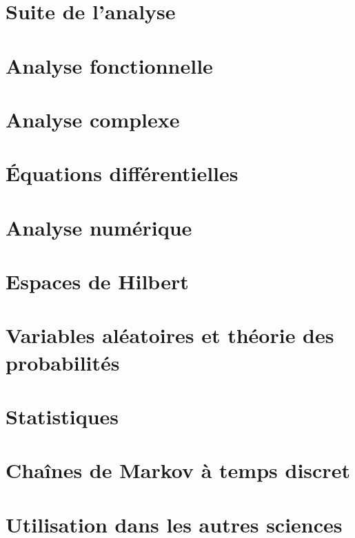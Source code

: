 \chapter{Suite de l'analyse}








\chapter{Analyse fonctionnelle}


\chapter{Analyse complexe}


\chapter{Équations différentielles}


\chapter{Analyse numérique}


\chapter{Espaces de Hilbert}



\chapter{Variables aléatoires et théorie des probabilités}



\chapter{Statistiques}


\chapter{Chaînes de Markov à temps discret}


\chapter{Utilisation dans les autres sciences}


